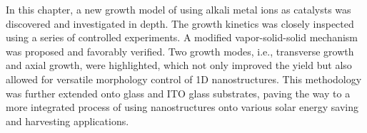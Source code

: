 In this chapter, a new growth model of  using alkali metal ions as catalysts was discovered and investigated in depth. The growth kinetics was closely inspected using a series of controlled experiments. A modified vapor-solid-solid mechanism was proposed and favorably verified. Two growth modes, i.e., transverse growth and axial growth, were highlighted, which not only improved the yield but also allowed for versatile morphology control of 1D  nanostructures. This methodology was further extended onto glass and ITO glass substrates, paving the way to a more integrated process of using  nanostructures onto various solar energy saving and harvesting applications. 
